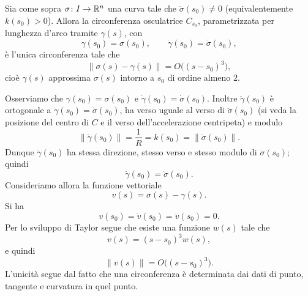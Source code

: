\documentclass[a4paper]{article}
\begin{document}
\begin{center}
\end{center}

\begin{snippettheorem}{}
Sia come sopra \(\sigma\colon I\to\mathbb{R}^n\) una curva tale che \(\ddot\sigma(s_0)\neq 0\) (equivalentemente \(k(s_0)>0\)). Allora la circonferenza osculatrice \(C_{s_0}\), parametrizzata per lunghezza d'arco tramite \(\gamma(s)\), con
\[
     \gamma(s_0)=\sigma(s_0),
     \qquad
     \dot\gamma(s_0)=\dot\sigma(s_0),
\]
è l'unica circonferenza tale che
\[
     \|\sigma(s)-\gamma(s)\|=O\bigl((s-s_0)^3\bigr),
\]
cioè \(\gamma(s)\) approssima \(\sigma(s)\) intorno a \(s_0\) di ordine almeno \(2\).
\end{snippettheorem}

\begin{snippetproof}{}
Osserviamo che \(\gamma(s_0)=\sigma(s_0)\) e \(\dot\gamma(s_0)=\dot\sigma(s_0)\). Inoltre \(\ddot\gamma(s_0)\) è ortogonale a \(\dot\gamma(s_0)=\dot\sigma(s_0)\), ha verso uguale al verso di \(\ddot\sigma(s_0)\) (si veda la posizione del centro di \(C\) e il verso dell'accelerazione centripeta) e modulo
\[
     \|\ddot\gamma(s_0)\|=\frac{1}{R}=k(s_0)=\|\ddot\sigma(s_0)\|.
\]
Dunque \(\ddot\gamma(s_0)\) ha stessa direzione, stesso verso e stesso modulo di \(\ddot\sigma(s_0)\); quindi
\[
     \ddot\gamma(s_0)=\ddot\sigma(s_0).
\]
Consideriamo allora la funzione vettoriale
\[
     v(s)=\sigma(s)-\gamma(s).
\]
Si ha
\[
     v(s_0)=\dot v(s_0)=\ddot v(s_0)=0.
\]
Per lo sviluppo di Taylor segue che esiste una funzione \(w(s)\) tale che
\[
     v(s)=(s-s_0)^3w(s),
\]
e quindi
\[
     \|v(s)\|=O\bigl((s-s_0)^3\bigr).
\]
L'unicità segue dal fatto che una circonferenza è determinata dai dati di punto, tangente e curvatura in quel punto.
\end{snippetproof}
\end{document}
